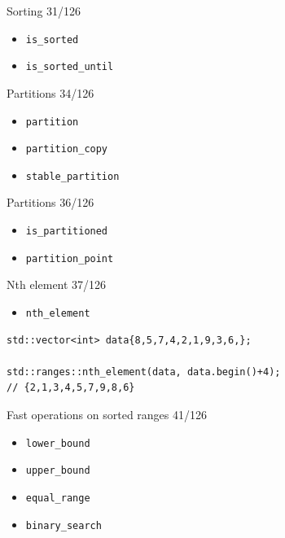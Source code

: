 \documentclass[aspectratio=169]{beamer}
\begin{document}
\begin{frame}{Sorting 31/126}
  \begin{itemize}
    \item{\texttt{is_sorted}}
    \item{\texttt{is_sorted_until}}
  \end{itemize}
\end{frame}

\begin{frame}{Partitions 34/126}
  \begin{itemize}
    \item{\texttt{partition}}
    \item{\texttt{partition_copy}}
    \item{\texttt{stable_partition}}
  \end{itemize}
\end{frame}

\begin{frame}{Partitions 36/126}
  \begin{itemize}
    \item{\texttt{is_partitioned}}
    \item{\texttt{partition_point}}
  \end{itemize}
\end{frame}

\begin{frame}{Nth element 37/126}
  \begin{itemize}
    \item{\texttt{nth_element}}
  \end{itemize}
\end{frame}

\begin{frame}[fragile]{}
\begin{verbatim}
std::vector<int> data{8,5,7,4,2,1,9,3,6,};

std::ranges::nth_element(data, data.begin()+4);
// {2,1,3,4,5,7,9,8,6}
\end{verbatim}
\end{frame}

\begin{frame}{Fast operations on sorted ranges 41/126}
  \begin{itemize}
    \item{\texttt{lower_bound}}
    \item{\texttt{upper_bound}}
    \item{\texttt{equal_range}}
    \item{\texttt{binary_search}}
  \end{itemize}
\end{frame}
\end{document}
